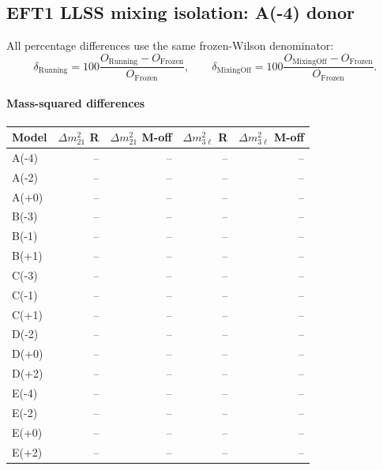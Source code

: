\subsection*{EFT1 LLSS mixing isolation: A(-4) donor}
All percentage differences use the same frozen-Wilson denominator:
\[\delta_{\mathrm{Running}}=100\frac{O_{\mathrm{Running}}-O_{\mathrm{Frozen}}}{O_{\mathrm{Frozen}}},\qquad\delta_{\mathrm{MixingOff}}=100\frac{O_{\mathrm{MixingOff}}-O_{\mathrm{Frozen}}}{O_{\mathrm{Frozen}}}.\]
\paragraph{Mass-squared differences}
\begin{center}
\begin{tabular}{lrrrr}
\hline
Model & $\Delta m^2_{21}$ R & $\Delta m^2_{21}$ M-off & $\Delta m^2_{3\ell}$ R & $\Delta m^2_{3\ell}$ M-off \\
\hline
A(-4) & -- & -- & -- & -- \\
A(-2) & -- & -- & -- & -- \\
A(+0) & -- & -- & -- & -- \\
B(-3) & -- & -- & -- & -- \\
B(-1) & -- & -- & -- & -- \\
B(+1) & -- & -- & -- & -- \\
C(-3) & -- & -- & -- & -- \\
C(-1) & -- & -- & -- & -- \\
C(+1) & -- & -- & -- & -- \\
D(-2) & -- & -- & -- & -- \\
D(+0) & -- & -- & -- & -- \\
D(+2) & -- & -- & -- & -- \\
E(-4) & -- & -- & -- & -- \\
E(-2) & -- & -- & -- & -- \\
E(+0) & -- & -- & -- & -- \\
E(+2) & -- & -- & -- & -- \\
\hline
\end{tabular}
\end{center}
